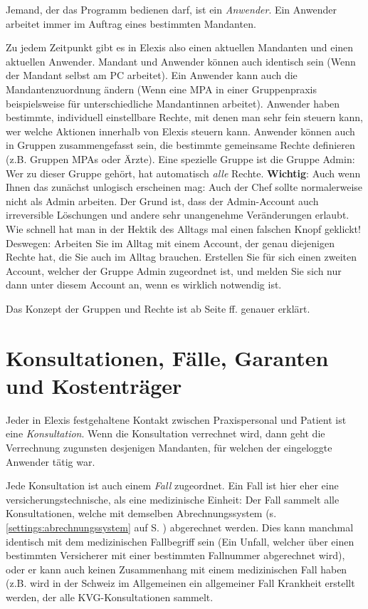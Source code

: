 \medskip

Jemand, der das Programm bedienen darf, ist ein \textit{Anwender}. Ein Anwender arbeitet immer im Auftrag eines bestimmten Mandanten.

Zu jedem Zeitpunkt gibt es in Elexis also einen aktuellen Mandanten und einen aktuellen Anwender.
Mandant und Anwender können auch identisch sein (Wenn der
Mandant selbst am PC arbeitet).
Ein Anwender kann auch die Mandantenzuordnung ändern (Wenn eine MPA in einer Gruppenpraxis beispielsweise für unterschiedliche
Mandantinnen arbeitet).
Anwender haben bestimmte, individuell einstellbare Rechte, mit denen man sehr
fein steuern kann, wer welche Aktionen innerhalb von Elexis steuern kann.
Anwender können auch in Gruppen zusammengefasst sein, die bestimmte gemeinsame
Rechte definieren (z.B. Gruppen \glqq MPAs\grqq{} oder \glqq Ärzte\grqq{}). Eine
spezielle Gruppe ist die Gruppe \glqq Admin\grqq{}: Wer zu dieser Gruppe gehört,
hat automatisch \textit{alle} Rechte.
\textbf{Wichtig}: Auch wenn Ihnen das zunächst unlogisch erscheinen mag: Auch
der Chef sollte normalerweise nicht als Admin  arbeiten.
Der Grund ist, dass der Admin-Account auch irreversible Löschungen und andere
sehr unangenehme Veränderungen erlaubt. Wie schnell hat man in der Hektik des
Alltags mal einen falschen Knopf geklickt!
Deswegen: Arbeiten Sie im Alltag mit einem Account, der genau diejenigen Rechte
hat, die Sie auch im Alltag brauchen. Erstellen Sie für sich einen zweiten
Account, welcher der Gruppe Admin zugeordnet ist, und melden Sie sich nur dann
unter diesem Account an, wenn es wirklich notwendig ist.

Das Konzept der Gruppen und Rechte ist ab Seite \pageref{sec:gruppen} ff.
genauer erklärt.

\section{Konsultationen, Fälle, Garanten und Kostenträger}
Jeder in Elexis festgehaltene Kontakt zwischen Praxispersonal und Patient ist eine \textit{Konsultation}. Wenn die Konsultation verrechnet wird, dann geht die Verrechnung zugunsten desjenigen Mandanten, für welchen der eingeloggte Anwender tätig war.

Jede Konsultation ist auch einem \textit{Fall} zugeordnet. Ein Fall ist hier eher eine versicherungstechnische, als eine medizinische Einheit: Der Fall sammelt alle Konsultationen, welche mit demselben Abrechnungssystem (s. \ref{settings:abrechnungssystem} auf S. \pageref{settings:abrechnungssystem}) abgerechnet werden. Dies kann manchmal identisch mit dem medizinischen Fallbegriff sein (Ein Unfall, welcher über einen bestimmten Versicherer mit einer bestimmten Fallnummer abgerechnet wird), oder er kann auch keinen Zusammenhang mit einem medizinischen Fall haben (z.B. wird in der Schweiz im Allgemeinen ein allgemeiner Fall \glqq Krankheit\grqq{} erstellt werden, der alle KVG-Konsultationen sammelt.

